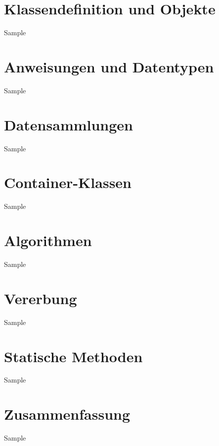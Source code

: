 \documentclass{hswbeamer}
\begin{document}


\section{Klassendefinition und Objekte}
\begin{frame}{Sample}
\end{frame}

\section{Anweisungen und Datentypen}
\begin{frame}{Sample}
\end{frame}

\section{Datensammlungen}
\begin{frame}{Sample}
\end{frame}

\section{Container-Klassen}
\begin{frame}{Sample}
\end{frame}

\section{Algorithmen}
\begin{frame}{Sample}
\end{frame}

\section{Vererbung}
\begin{frame}{Sample}
\end{frame}

\section{Statische Methoden}
\begin{frame}{Sample}
\end{frame}

\section{Zusammenfassung}
\begin{frame}{Sample}
\end{frame}
\end{document}
